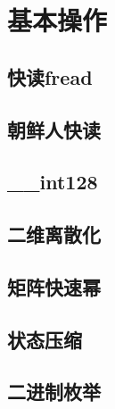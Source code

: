 \documentclass[twoside,a4paper]{article}
\begin{document}
\small

\newpage
\pagestyle{empty}
\renewcommand{\contentsname}{目录}
\tableofcontents
\newpage\clearpage
\newpage
\pagestyle{fancy}
\setcounter{page}{1}   %

\section{基本操作}

\subsection{快读fread}


\subsection{朝鲜人快读}


\subsection{\_\_int128}


\subsection{二维离散化}


\subsection{矩阵快速幂}


\subsection{状态压缩}


\subsection{二进制枚举}

\end{document}
